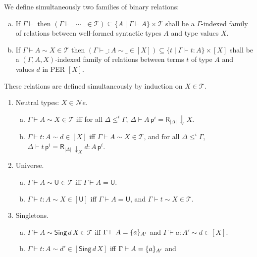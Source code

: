 \documentclass{LMCS}
\theoremstyle{plain}\newtheorem{satz}[thm]{Satz}
\newcommand{\derN}{\vdash}
\newcommand{\subsTm}[2]{#1\,#2}
\newcommand{\TmU}{\mathsf{U}}
\newcommand{\p}{\mathsf{p}}
\newcommand{\dctx}[1]{#1\vdash}
\newcommand{\dtype}[2]{#1\vdash#2}
\newcommand{\dterm}[3]{#1\vdash#3:#2}
\newcommand{\deqtype}[3]{#1\vdash#2=#3}
\newcommand{\deqterm}[4]{#1\vdash#3=#4:#2}
\newcommand{\lift}[2]{\subsTm{#2}{\p^{#1}}}
\newcommand{\Da}[1]{\mathop{\Downarrow} #1}
\newcommand{\da}[2]{\mathop{\downarrow}\nolimits_{#1}{#2}}
\newcommand{\reifyC}[2]{\mathsf{R}_{|#1|}\,#2}
\newcommand{\perne}{\mathord{\mathcal{N}\!\mathit{e}}}
\newcommand{\perT}{\mathcal{T}}
\newcommand{\rel}{\sim}
\newcommand{\iU}{\mathsf{U}}
\newcommand{\iSing}[2]{\mathsf{Sing}\,#1\,{#2}}
\begin{document}
\begin{defi}
  \label{def:logrel} We define simultaneously two families of binary
   relations:
  \begin{enumerate}[(a)]
  \item If $\dctx{\Gamma}$ then $(\Gamma \derN \_ \rel \_ \in \perT) \subseteq \{ A \mid
    \dtype{\Gamma}{A}\} \times \perT$ 
    shall be a $\Gamma$-indexed family of relations
    between well-formed syntactic types $A$ and type values $X$.
  \item If $\dtype{\Gamma}{A}\rel X\in \perT$ then $(\Gamma \derN \_ :
    A \rel \_ \in [X]) \subseteq
    \{ t \mid \dterm{\Gamma}{A}{t}\} \times [X]$
    shall be a $(\Gamma,A,X)$-indexed family of relations between
    terms $t$ of type $A$ and values $d$ in PER $[X]$.
  \end{enumerate}
These relations are defined simultaneously by induction on $X \in
  \perT$.
  \begin{enumerate}[(1)]
  \item Neutral types: $X \in \perne$.
    \begin{enumerate}[(a)]
    \item $\dtype{\Gamma}{A}\rel X \in \perT$ iff
      for all $\Delta \leqslant^i \Gamma$,
      $\deqtype{\Delta}{\lift{i}{A}}{\reifyC{\Delta}{\Da{X}}}$.
    \item $\dterm{\Gamma}{A}{t}\rel d\in [X]$ iff  $\dtype{\Gamma}{A}\rel X \in \perT$, and
      for all $\Delta \leqslant^i \Gamma$,
      $\deqterm{\Delta}{\lift{i}{A}}{\lift{i}{t}}{\reifyC{\Delta}{\da{X}{d}}}$.
    \end{enumerate}
  \item Universe.
    \begin{enumerate}[(a)]
    \item $\dtype{\Gamma}{A}\rel \iU \in \perT$ iff
      $\deqtype{\Gamma}{A}{\TmU}$.
    \item $\dterm{\Gamma}{A}{t}\rel X\in [\iU]$ iff
      $\deqtype{\Gamma}{A}{\TmU}$, and $\dtype{\Gamma}{t}\rel
      X\in\perT$.
    \end{enumerate}
  \item Singletons.
    \begin{enumerate}[(a)]
    \item $\dtype{\Gamma}{A}\rel \iSing{d}{X} \in \perT$ iff
      $\deqtype{\Gamma}{A}{\singTm{a}{A'}}$ and
      $\dterm{\Gamma}{A'}{a}\rel d\in [X]$.
    \item $\dterm{\Gamma}{A}{t}\rel d'\in [\iSing{d}{X}]$ iff
      $\deqtype{\Gamma}{A}{\singTm{a}{A'}}$ and

\end{enumerate}
\end{enumerate}
\end{defi}
\end{document}
